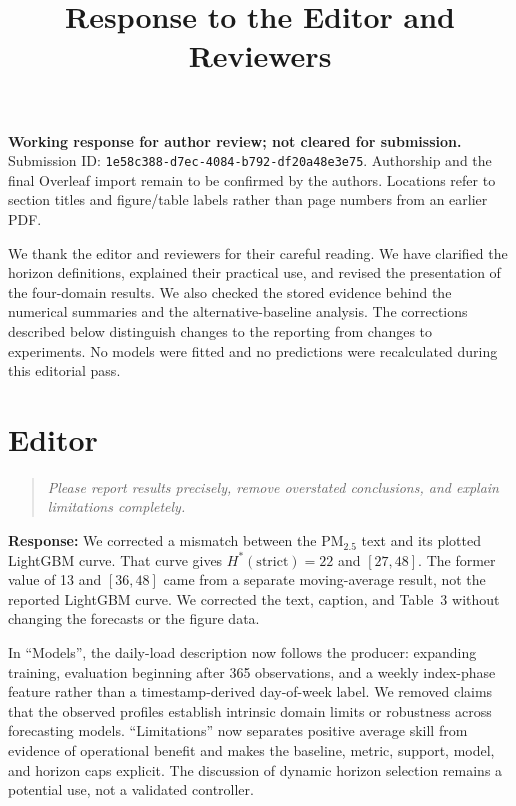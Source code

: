 \documentclass[11pt,a4paper]{article}
\title{\textbf{Response to the Editor and Reviewers}}
\author{}
\date{}
\let\originalsection\section
\renewcommand{\section}{\Needspace{12\baselineskip}\originalsection}
\newenvironment{reviewcomment}
  {\begin{quote}\itshape}
  {\end{quote}}
\newcommand{\response}{\noindent\textbf{Response:} }
\begin{document}
\maketitle
\textbf{Working response for author review; not cleared for submission.}
Submission ID: \texttt{1e58c388-d7ec-4084-b792-df20a48e3e75}.
Authorship and the final Overleaf import remain to be confirmed by the authors. Locations refer to section titles and figure/table labels rather
than page numbers from an earlier PDF.

We thank the editor and reviewers for their careful reading. We have
clarified the horizon definitions, explained their practical use, and
revised the presentation of the four-domain results. We also checked the
stored evidence behind the numerical summaries and the alternative-baseline
analysis. The corrections described below distinguish changes to the
reporting from changes to experiments. No models were fitted and no
predictions were recalculated during this editorial pass.


\section*{Editor}

\begin{reviewcomment}
Please report results precisely, remove overstated conclusions, and explain
limitations completely.
\end{reviewcomment}

\response
We corrected a mismatch between the PM$_{2.5}$ text and its plotted
LightGBM curve. That curve gives $H^*(\mathrm{strict})=22$ and $[27,48]$.
The former value of 13 and $[36,48]$ came from a separate moving-average
result, not the reported LightGBM curve. We corrected the text, caption,
and Table~3 without changing the forecasts or the figure data.

In ``Models'', the daily-load description now follows the producer:
expanding training, evaluation beginning after 365 observations, and a
weekly index-phase feature rather than a timestamp-derived day-of-week
label. We removed claims that the observed profiles establish intrinsic
domain limits or robustness across forecasting models. ``Limitations''
now separates positive average skill from evidence of operational benefit
and makes the baseline, metric, support, model, and horizon caps explicit.
The discussion of dynamic horizon selection remains a potential use,
not a validated controller.
\end{document}
